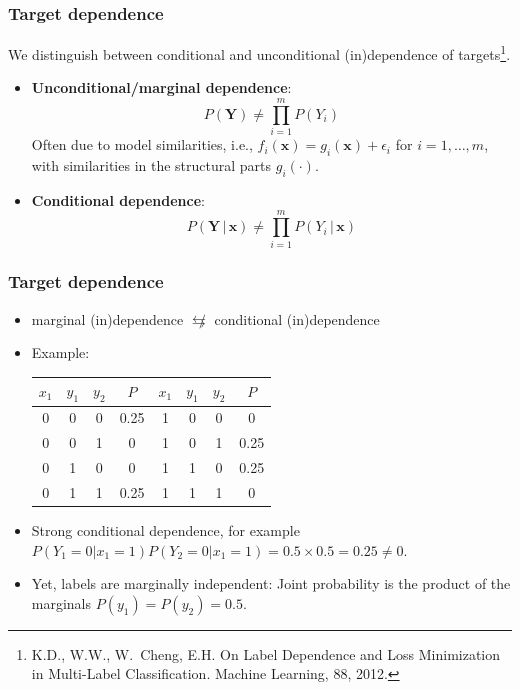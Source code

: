 \documentclass[]{beamer}
\renewcommand{\Pr}{P}
\newcommand{\given}{\, | \,}
\newcommand{\bx}{\boldsymbol{x}}
\newcommand{\bY}{\boldsymbol{Y}}
\renewcommand{\emph}[1]{\textbf{\color{putblue}#1}}
\begin{document}
\begin{frame}
\frametitle{Target dependence}
We distinguish between conditional and unconditional (in)dependence of targets\footnote{K.D., W.W., W.\ Cheng, E.H. On Label Dependence and Loss Minimization in Multi-Label Classification. Machine Learning, 88, 2012.}.
\begin{itemize}
\item \emph{Unconditional/marginal dependence}: 
$$
\Pr(\bY) \ne \prod_{i=1}^m \Pr(Y_i) 
$$
Often due to model similarities, i.e., $f_i(\bx) = g_i(\bx) + \epsilon_i$ for $i = 1, \ldots, m$, with similarities in the structural parts $g_i(\cdot)$.


\item \emph{Conditional dependence}:
$$
\Pr(\bY \given \bx) \ne \prod_{i=1}^m \Pr(Y_i \given \bx)
$$

\end{itemize}
\end{frame}

\begin{frame}
\frametitle{Target dependence}
\begin{itemize}
\item
marginal (in)dependence $\not \leftrightarrows$ conditional (in)dependence

\item Example: 
\begin{center}
\begin{tabular}{cccc@{$\qquad$}cccc}
\toprule
$x_1$ & $y_1$ & $y_2$ & $\Pr$ & $x_1$ & $y_1$ & $y_2$ & $\Pr$ \\
\midrule
0   & 0   & 0   & 0.25  & 1   & 0   & 0   & 0       \\
0   & 0   & 1   & 0     & 1   & 0   & 1   & 0.25  \\
0   & 1   & 0   & 0     & 1   & 1   & 0   & 0.25 \\
0   & 1   & 1   & 0.25   & 1   & 1   & 1   & 0 \\
\bottomrule
\end{tabular}
\end{center}

\medskip 

\item Strong conditional dependence, for example
$\Pr(Y_1 = 0 | x_1 = 1) \Pr(Y_2 = 0 | x_1 = 1) = 0.5 \times 0.5 = 0.25 \neq 0$.
\item Yet, labels are marginally independent: Joint probability is the product of the marginals $\Pr(y_1) = \Pr(y_2) = 0.5$.
\end{itemize}
\end{frame}
\end{document}
